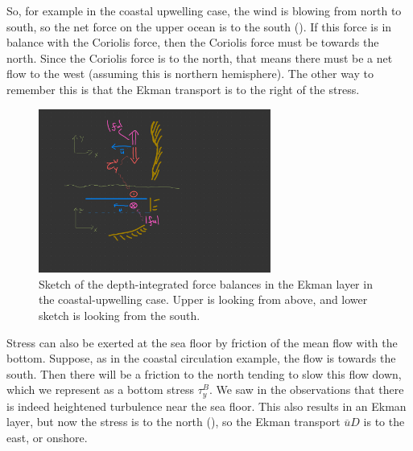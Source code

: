 So, for example in the coastal upwelling case, the wind is blowing from north to south, so the net force on the upper ocean is to the south ().  If this force is in balance with the Coriolis force, then the Coriolis force must be towards the north.  Since the Coriolis force is to the north, that means there must be a net flow to the west (assuming this is northern hemisphere).  The other way to remember this is that the Ekman transport is to the right of the stress.  

\begin{figure}[hbt]
  \begin{center}
    \includegraphics[width=3in]{figs/Coriolis/EkmanLayerForces}
    \caption{Sketch of the depth-integrated force balances in the Ekman layer in the coastal-upwelling case. Upper is looking from above, and lower sketch is looking from the south. }
    \label{fig:EkmanLayerForces}  
  \end{center}
\end{figure}

Stress can also be exerted at the sea floor by friction of the mean flow with the bottom.  Suppose, as in the coastal circulation example, the flow is towards the south.  Then there will be a friction to the north tending to slow this flow down, which we represent as a bottom stress $\tau_y^B$.  We saw in the observations that there is indeed heightened turbulence near the sea floor.  This also results in an Ekman layer, but now the stress is to the north (), so the Ekman transport $\overline{u}D$ is to the east, or onshore.  

